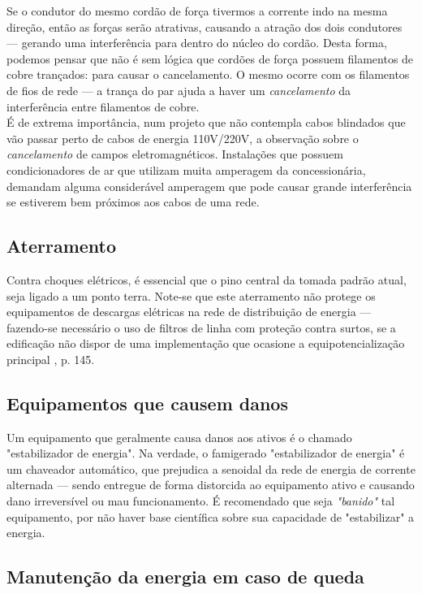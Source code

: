 \documentclass[	DIV=calc,%
							paper=a4,%
							fontsize=12pt,%
							onecolumn]{scrartcl}	 					%
\begin{document}
Se o condutor do mesmo cordão de força tivermos a corrente indo na mesma direção, então as forças serão atrativas, causando a atração dos dois condutores --- gerando uma interferência para dentro do núcleo do cordão. Desta forma, podemos pensar que não é sem lógica que cordões de força possuem filamentos de cobre trançados: para causar o cancelamento. O mesmo ocorre com os filamentos de fios de rede --- a trança do par ajuda a haver um \textit{cancelamento} da interferência entre filamentos de cobre.
\\

É de extrema importância, num projeto que não contempla cabos blindados  que vão passar perto de cabos de energia 110V/220V, a observação sobre o \textit{cancelamento} de campos eletromagnéticos. Instalações que possuem condicionadores de ar que utilizam muita amperagem da concessionária, demandam alguma considerável amperagem que pode causar grande interferência se estiverem bem próximos aos cabos de uma rede.  
\\

\subsection{Aterramento}

Contra choques elétricos, é essencial que o pino central da tomada padrão atual, seja ligado a um ponto terra. Note-se que este aterramento não protege os equipamentos de descargas elétricas na rede de distribuição de energia --- fazendo-se necessário o uso de filtros de linha com proteção contra surtos, se a edificação não dispor de uma implementação que ocasione a equipotencialização principal \cite{abnt5410}, p. 145.

\subsection{Equipamentos que causem danos}

Um equipamento que geralmente causa danos aos ativos é o chamado "estabilizador de energia". Na verdade, o famigerado "estabilizador de energia" é um chaveador automático, que prejudica a senoidal da rede de energia de corrente alternada --- sendo entregue de forma distorcida ao equipamento ativo e causando dano irreversível ou mau funcionamento. É recomendado que seja \textit{"banido"} tal equipamento, por não haver base científica sobre sua capacidade de "estabilizar" a energia.

\subsection{Manutenção da energia em caso de queda}
\end{document}

